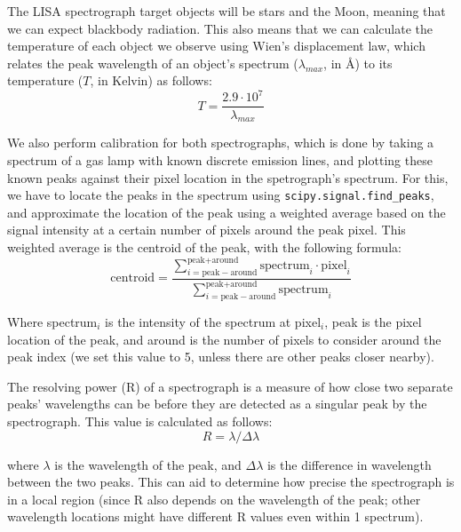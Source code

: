 \documentclass[twocolumn]{aastex702}
\begin{document}
			The LISA spectrograph target objects will be stars and the Moon, meaning that we can expect blackbody radiation. This also means that we can calculate the temperature of each object we observe using Wien's displacement law, which relates the peak wavelength of an object's spectrum ($\lambda_{max}$, in Å) to its temperature ($T$, in Kelvin) as follows:
			\begin{equation}\label{eq:wien}
				T = \frac{2.9 \cdot 10^7}{\lambda_{max}}
			\end{equation}
		
			We also perform calibration for both spectrographs, which is done by taking a spectrum of a gas lamp with known discrete emission lines, and plotting these known peaks against their pixel location in the spetrograph's spectrum. For this, we have to locate the peaks in the spectrum using \texttt{scipy.signal.find\_peaks}, and approximate the location of the peak using a weighted average based on the signal intensity at a certain number of pixels around the peak pixel. This weighted average is the centroid of the peak, with the following formula:
			\begin{equation}\label{eq:centroid}
  			\text{centroid} = \frac{\sum_{i=\text{peak} - \text{around}}^{\text{peak} + \text{around}}\text{spectrum}_i \cdot \text{pixel}_i}{\sum_{i=\text{peak} - \text{around}}^{\text{peak} + \text{around}} \text{spectrum}_i}
  		\end{equation}
  		
  		Where spectrum$_i$ is the intensity of the spectrum at pixel$_i$, peak is the pixel location of the peak, and around is the number of pixels to consider around the peak index (we set this value to 5, unless there are other peaks closer nearby).
  		
  		The resolving power (R) of a spectrograph is a measure of how close two separate peaks' wavelengths can be before they are detected as a singular peak by the spectrograph. This value is calculated as follows:
  		\begin{equation}\label{eq:R}
  			R = \lambda / \Delta\lambda
  		\end{equation}
  		
  		where $\lambda$ is the wavelength of the peak, and $\Delta\lambda$ is the difference in wavelength between the two peaks. This can aid to determine how precise the spectrograph is in a local region (since R also depends on the wavelength of the peak; other wavelength locations might have different R values even within 1 spectrum).
		
\end{document}
